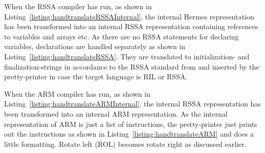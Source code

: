When the RSSA compiler has run, as shown in Listing~\ref{listing:handtranslateRSSAInternal}, the internal Hermes representation has been transformed into an internal RSSA representation containing references to variables and arrays etc.
As there are no RSSA statements for declaring variables, declarations are handled separately as shown in Listing~\ref{listing:handtranslateRSSA}. They are translated to initialization- and finalization-strings in accordance to the RSSA standard from\cite{10.1007/978-3-319-41579-6_16} and inserted by the pretty-printer in case the target language is RIL or RSSA.

When the ARM compiler has run, as shown in Listing~\ref{listing:handtranslateARMInternal}, the internal RSSA representation has been transformed into an internal ARM representation.
As the internal representation of ARM is just a list of instructions, the pretty-printer just prints out the instructions as shown in Listing~\ref{listing:handtranslateARM} and does a little formatting. Rotate left (ROL) becomes rotate right as discussed earlier.














